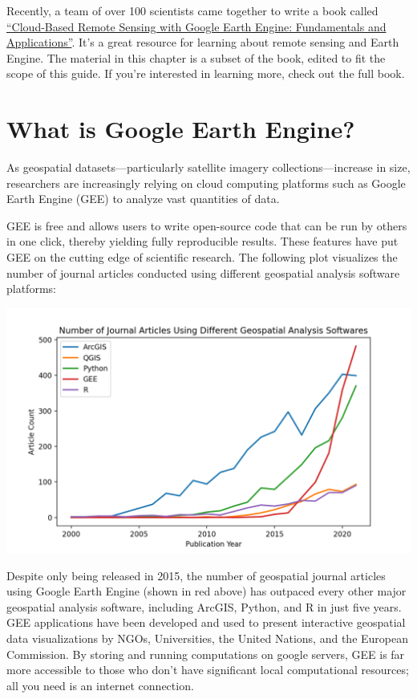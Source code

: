 \documentclass[
  letterpaper,
  DIV=11,
  numbers=noendperiod]{scrreprt}
\begin{document}
Recently, a team of over 100 scientists came together to write a book
called \href{https://www.eefabook.org/}{``Cloud-Based Remote Sensing
with Google Earth Engine: Fundamentals and Applications''}. It's a great
resource for learning about remote sensing and Earth Engine. The
material in this chapter is a subset of the book, edited to fit the
scope of this guide. If you're interested in learning more, check out
the full book.

\hypertarget{what-is-google-earth-engine}{%
\section*{What is Google Earth
Engine?}\label{what-is-google-earth-engine}}


As geospatial datasets---particularly satellite imagery
collections---increase in size, researchers are increasingly relying on
cloud computing platforms such as Google Earth Engine (GEE) to analyze
vast quantities of data.

GEE is free and allows users to write open-source code that can be run
by others in one click, thereby yielding fully reproducible results.
These features have put GEE on the cutting edge of scientific research.
The following plot visualizes the number of journal articles conducted
using different geospatial analysis software platforms:

\includegraphics{././images/WoS Articles.png}

Despite only being released in 2015, the number of geospatial journal
articles using Google Earth Engine (shown in red above) has outpaced
every other major geospatial analysis software, including ArcGIS,
Python, and R in just five years. GEE applications have been developed
and used to present interactive geospatial data visualizations by NGOs,
Universities, the United Nations, and the European Commission. By
storing and running computations on google servers, GEE is far more
accessible to those who don't have significant local computational
resources; all you need is an internet connection.
\end{document}
